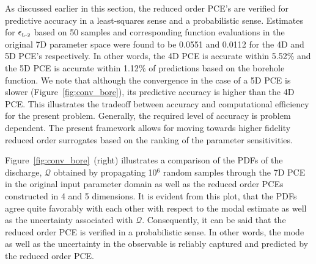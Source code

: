 As discussed earlier in this section, the reduced order PCE's are verified for
predictive accuracy in a least-squares sense and a probabilistic sense.
Estimates for $\epsilon_{\mbox{\tiny{L-2}}}$ based on 50 samples and
corresponding function evaluations in the original 7D parameter space were
found to be 0.0551 and 0.0112 for the 4D and 5D PCE's respectively. In other
words, the 4D PCE is accurate within 5.52$\%$ and the 5D PCE is accurate within
1.12$\%$ of predictions based on the borehole function. We note  that although
the convergence in the case of a 5D PCE is slower (Figure~\ref{fig:conv_bore}),
its predictive accuracy is higher than the 4D PCE. This illustrates the
tradeoff between accuracy and computational efficiency for the present 
problem. Generally, the required level of accuracy is problem dependent. 
The present framework allows for moving towards higher fidelity 
reduced order surrogates based on the ranking of the parameter sensitivities. 
 


Figure~\ref{fig:conv_bore}~(right) illustrates a comparison of the PDFs
of the
discharge, $\mathcal{Q}$ obtained by propagating 10$^6$ random
samples through the 7D PCE in the original input parameter domain as well as
the reduced order PCEs constructed in 4 and 5 dimensions. 
It is evident from this plot, that the PDFs agree quite favorably with each
other with respect to the modal estimate as well as the uncertainty associated with 
$\mathcal{Q}$. 
Consequently, it can be said that the reduced order PCE is verified in a
probabilistic sense. In other words, the mode as well as the uncertainty in the
observable is reliably captured and predicted by the reduced order PCE. 
% 
